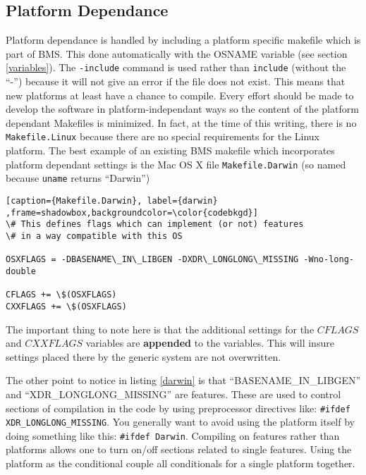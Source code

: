 \documentclass[12pt]{article}
\begin{document}
\subsection{Platform Dependance}
Platform dependance is handled by including a platform specific 
makefile which is part of BMS. This done automatically with the OSNAME
variable (see section \ref{variables}). The {\lstinline !-include!}
command is used rather than {\lstinline !include!} (without the
``-'') because it will not give an error if the file does not exist.
This means that new platforms at least have a chance to compile.
Every effort should be made to develop the software in
platform-independant ways so the content of the platform dependant
Makefiles is minimized.
In fact, at the time of this writing, there is no
{\lstinline !Makefile.Linux!} because there are no special requirements
for the Linux platform. The best example of an existing BMS makefile
which incorporates platform dependant settings is the Mac OS X
file {\lstinline !Makefile.Darwin!} (so named because {\lstinline !uname!}
returns ``Darwin'')

\begin{lstlisting}[caption={Makefile.Darwin}, label={darwin}
,frame=shadowbox,backgroundcolor=\color{codebkgd}]
\# This defines flags which can implement (or not) features
\# in a way compatible with this OS

OSXFLAGS = -DBASENAME\_IN\_LIBGEN -DXDR\_LONGLONG\_MISSING -Wno-long-double

CFLAGS += \$(OSXFLAGS)
CXXFLAGS += \$(OSXFLAGS)
\end{lstlisting}

The important thing to note here is that the additional settings
for the $CFLAGS$ and $CXXFLAGS$ variables are {\bf appended} to
the variables. This will insure settings placed there by the
generic system are not overwritten.

The other point to notice in listing \ref{darwin} is that 
``BASENAME\_IN\_LIBGEN'' and ``XDR\_LONGLONG\_MISSING''
are features. These are used to control sections of compilation
in the code by using preprocessor directives like:
{\lstinline !#ifdef XDR_LONGLONG_MISSING!}. You generally want to
avoid using the platform itself by doing something like this:
{\lstinline !#ifdef Darwin!}. Compiling on features rather than
platforms allows one to turn on/off sections related to single features.
Using the platform as the conditional couple all conditionals for
a single platform together.

\end{document}

